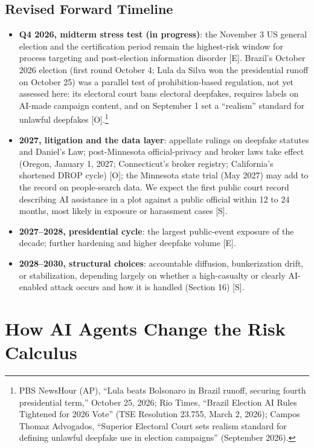 \documentclass[11pt,letterpaper]{article}
\begin{document}
\subsection{Revised Forward Timeline}

\begin{itemize}
  \item \textbf{Q4 2026, midterm stress test (in progress)}: the November 3 US general election and the certification period remain the highest-risk window for process targeting and post-election information disorder [E]. Brazil's October 2026 election (first round October 4; Lula da Silva won the presidential runoff on October 25) was a parallel test of prohibition-based regulation, not yet assessed here: its electoral court bans electoral deepfakes, requires labels on AI-made campaign content, and on September 1 set a ``realism'' standard for unlawful deepfakes [O].\footnote{PBS NewsHour (AP), ``Lula beats Bolsonaro in Brazil runoff, securing fourth presidential term,'' October 25, 2026; Rio Times, ``Brazil Election AI Rules Tightened for 2026 Vote'' (TSE Resolution 23.755, March 2, 2026); Campos Thomaz Advogados, ``Superior Electoral Court sets realism standard for defining unlawful deepfake use in election campaigns'' (September 2026).}
  \item \textbf{2027, litigation and the data layer}: appellate rulings on deepfake statutes and Daniel's Law; post-Minnesota official-privacy and broker laws take effect (Oregon, January 1, 2027; Connecticut's broker registry; California's shortened DROP cycle) [O]; the Minnesota state trial (May 2027) may add to the record on people-search data.
 We expect the first public court record describing AI assistance in a plot against a public official within 12 to 24 months, most likely in exposure or harassment cases [S].
  \item \textbf{2027--2028, presidential cycle}: the largest public-event exposure of the decade; further hardening and higher deepfake volume [E].
  \item \textbf{2028--2030, structural choices}: accountable diffusion, bunkerization drift, or stabilization, depending largely on whether a high-casualty or clearly AI-enabled attack occurs and how it is handled (Section 16) [S].
\end{itemize}

\section{How AI Agents Change the Risk Calculus}
\end{document}
